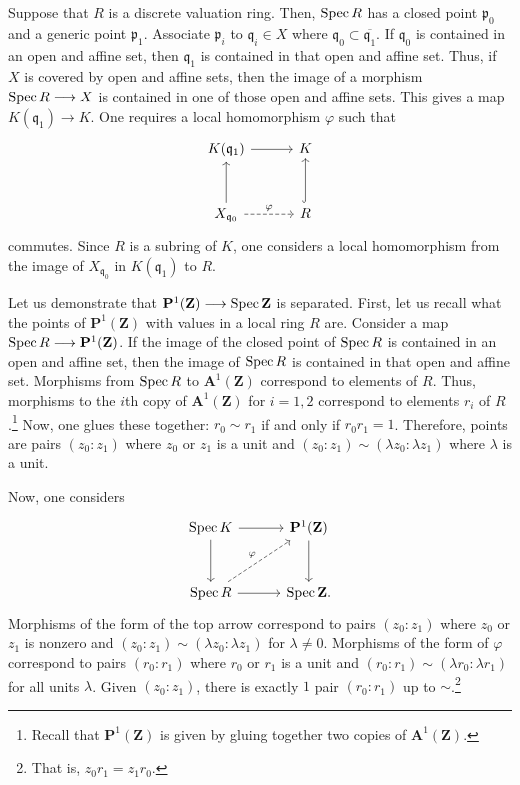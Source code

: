 \documentclass [11 pt, oneside] {article}
\begin{document}
Suppose that $R$ is a discrete valuation ring. Then, $\operatorname{Spec} R$ has a closed point $\mathfrak{p}_0$ and a generic point $\mathfrak{p}_1$. Associate $\mathfrak{p}_i$ to $\mathfrak{q}_i\in X$ where $\mathfrak{q}_0\subset \overline{\mathfrak{q}_1}$. If $\mathfrak{q}_0$ is contained in an open and affine set, then $\mathfrak{q}_1$ is contained in that open and affine set. Thus, if $X$ is covered by open and affine sets, then the image of a morphism $\operatorname{Spec} R\longrightarrow X$ is contained in one of those open and affine sets. This gives a map $K(\mathfrak{q}_1)\longrightarrow K$. One requires a local homomorphism $\varphi$ such that
\[
\begin{tikzcd}[column sep = 3 em, row sep = 3 em]
	K(\mathfrak{q}_1)\ar[r]&K\\ X_{\mathfrak{q}_0} \ar[u] \ar[r,dashed,"\varphi"] &R\ar[u,hookrightarrow]
\end{tikzcd}
\]
commutes. Since $R$ is a subring of $K$, one considers a local homomorphism from the image of $X_{\mathfrak{q}_0}$ in $K(\mathfrak{q}_1)$ to $R$.

\begin{example}[ ]\label{}\text{}
Let us demonstrate that $\mathbf{P}^1(\mathbf{Z})\longrightarrow \operatorname{Spec} \mathbf{Z}$ is separated. First, let us recall what the points of $\mathbf{P}^1(\mathbf{Z})$ with values in a local ring $R$ are. Consider a map $\operatorname{Spec} R\longrightarrow \mathbf{P}^1(\mathbf{Z})$. If the image of the closed point of $\operatorname{Spec} R$ is contained in an open and affine set, then the image of $\operatorname{Spec} R$ is contained in that open and affine set. Morphisms from $\operatorname{Spec} R$ to $\mathbf{A}^1(\mathbf{Z})$ correspond to elements of $R$. 
Thus, morphisms to the $i$th copy of $\mathbf{A}^1(\mathbf{Z})$ for $i=1,2$ correspond to elements $r_i$ of $R$.\footnote{Recall that $\mathbf{P}^1(\mathbf{Z})$ is given by gluing together two copies of $\mathbf{A}^1(\mathbf{Z})$.} Now, one glues these together: $r_0\sim r_1$ if and only if $r_0r_1 = 1$. Therefore, points are pairs $(z_0:z_1)$ where $z_0$ or $z_1$ is a unit and $(z_0:z_1)\sim (\lambda z_0:\lambda z_1)$ where $\lambda$ is a unit.

Now, one considers
\[
\begin{tikzcd}[column sep = 3 em, row sep = 3 em]
	\Spec K \ar[r]\ar[d] & \mathbf{P}^1(\mathbf{Z})\ar[d]\\
	\Spec R \ar[r]\ar[ur,dashed,"\varphi"] &\Spec \mathbf{Z}.
\end{tikzcd}
\]
Morphisms of the form of the top arrow correspond to pairs $(z_0:z_1)$ where $z_0$ or $z_1$ is nonzero and $(z_0:z_1)\sim(\lambda z_0:\lambda z_1)$ for $\lambda\ne 0$. Morphisms of the form of $\varphi$ correspond to pairs $(r_0:r_1)$ where $r_0$ or $r_1$ is a unit and $(r_0:r_1)\sim(\lambda r_0:\lambda r_1)$ for all units $\lambda$.
Given $(z_0:z_1)$, there is exactly $1$ pair $(r_0:r_1)$ up to $\sim$.\footnote{That is, $z_0r_1 = z_1r_0$.}
\end{example}
\end{document}

